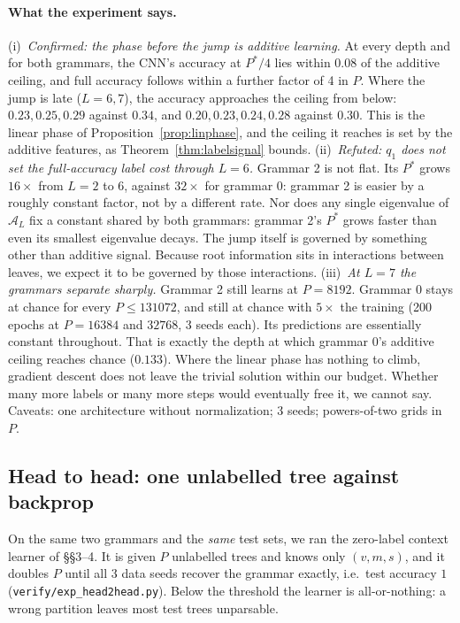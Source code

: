\documentclass[11pt]{article}
\theoremstyle{definition}
\begin{document}
\paragraph{What the experiment says.}
(i)~\emph{Confirmed: the phase before the jump is additive learning.} At every depth and for both
grammars, the CNN's accuracy at $P^*/4$ lies within $0.08$ of the additive ceiling, and full accuracy
follows within a further factor of 4 in $P$. Where the jump is late ($L=6,7$), the accuracy approaches
the ceiling from below: $0.23,0.25,0.29$ against $0.34$, and $0.20,0.23,0.24,0.28$ against $0.30$. This is the linear phase of Proposition~\ref{prop:linphase},
and the ceiling it reaches is set by the additive features, as Theorem~\ref{thm:labelsignal} bounds.
(ii)~\emph{Refuted: $q_1$ does not set the full-accuracy label cost through $L=6$.} Grammar 2 is not
flat. Its $P^*$ grows $16\times$ from $L=2$ to $6$, against $32\times$ for grammar 0: grammar 2 is
easier by a roughly constant factor, not by a different rate. Nor does any single eigenvalue of
$\mathcal A_L$ fix a constant shared by both grammars: grammar 2's $P^*$ grows faster than even its
smallest eigenvalue decays. The jump itself is governed by something other than additive signal.
Because root information sits in interactions between leaves, we expect it to be governed by those
interactions.
(iii)~\emph{At $L=7$ the grammars separate sharply.} Grammar 2 still learns at $P=8192$. Grammar 0
stays at chance for every $P\le131072$, and still at chance with $5\times$ the training (200 epochs at
$P=16384$ and $32768$, 3 seeds each). Its predictions are essentially constant throughout. That is
exactly the depth at which grammar 0's additive ceiling reaches chance ($0.133$). Where the linear
phase has nothing to climb, gradient descent does not leave the trivial solution within our budget.
Whether many more labels or many more steps would eventually free it, we cannot say.
Caveats: one architecture without normalization; 3 seeds; powers-of-two grids in $P$.

\subsection{Head to head: one unlabelled tree against backprop}\label{sec:h2h}
On the same two grammars and the \emph{same} test sets, we ran the zero-label context learner of
\S\S3--4. It is given $P$ unlabelled trees and knows only $(v,m,s)$, and it doubles $P$ until all 3
data seeds recover the grammar exactly, i.e.\ test accuracy $1$ (\texttt{verify/exp\_head2head.py}).
Below the threshold the learner is all-or-nothing: a wrong partition leaves most test trees
unparsable.
\end{document}
